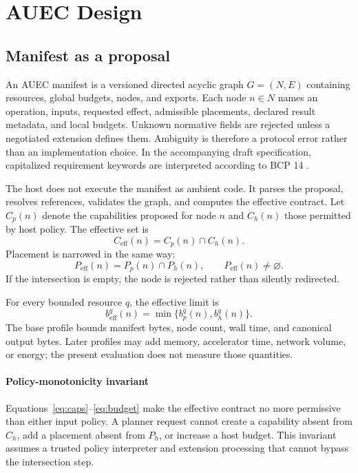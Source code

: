 \section{AUEC Design}
\label{sec:design}

\subsection{Manifest as a proposal}
An AUEC manifest is a versioned directed acyclic graph $G=(N,E)$ containing resources, global budgets, nodes, and exports. Each node $n\in N$ names an operation, inputs, requested effect, admissible placements, declared result metadata, and local budgets. Unknown normative fields are rejected unless a negotiated extension defines them. Ambiguity is therefore a protocol error rather than an implementation choice. In the accompanying draft specification, capitalized requirement keywords are interpreted according to BCP 14 \cite{RFC2119,RFC8174}.

The host does not execute the manifest as ambient code. It parses the proposal, resolves references, validates the graph, and computes the effective contract. Let $C_p(n)$ denote the capabilities proposed for node $n$ and $C_h(n)$ those permitted by host policy. The effective set is
\begin{equation}
C_{\mathrm{eff}}(n)=C_p(n)\cap C_h(n).
\label{eq:caps}
\end{equation}
Placement is narrowed in the same way:
\begin{equation}
P_{\mathrm{eff}}(n)=P_p(n)\cap P_h(n), \qquad P_{\mathrm{eff}}(n)\neq\varnothing.
\label{eq:placement}
\end{equation}
If the intersection is empty, the node is rejected rather than silently redirected.

For every bounded resource $q$, the effective limit is
\begin{equation}
b_{\mathrm{eff}}^q(n)=\min\{b_p^q(n),b_h^q(n)\}.
\label{eq:budget}
\end{equation}
The base profile bounds manifest bytes, node count, wall time, and canonical output bytes. Later profiles may add memory, accelerator time, network volume, or energy; the present evaluation does not measure those quantities.

\paragraph{Policy-monotonicity invariant}
Equations~\ref{eq:caps}--\ref{eq:budget} make the effective contract no more permissive than either input policy. A planner request cannot create a capability absent from $C_h$, add a placement absent from $P_h$, or increase a host budget. This invariant assumes a trusted policy interpreter and extension processing that cannot bypass the intersection step.

